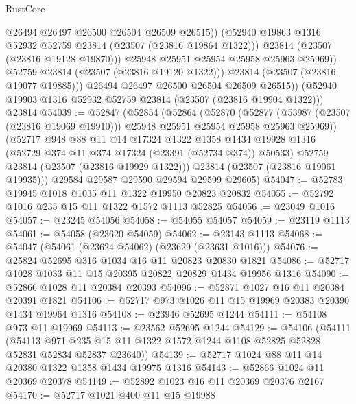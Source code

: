 \begin{lexlean}{RustCore}
\begin{coremodule}
                      @26494
                      @26497
                      @26500
                      @26504
                      @26509
                      @26515))
                  (@52940 @19863 @1316 @52932 @52759 @23814 (@23507 (@23816 @19864 @1322)))
                  @23814
                  (@23507 (@23816 @19128 @19870)))
                @25948
                @25951
                @25954
                @25958
                @25963
                @25969))
            @52759
            @23814
            (@23507 (@23816 @19120 @1322)))
          @23814
          (@23507 (@23816 @19077 @19885)))
        @26494
        @26497
        @26500
        @26504
        @26509
        @26515))
    (@52940 @19903 @1316 @52932 @52759 @23814 (@23507 (@23816 @19904 @1322)))
    @23814
@54039 := @52847
    (@52854
      (@52864
        (@52870
          (@52877
            (@53987 (@23507 (@23816 @19069 @19910)))
            @25948
            @25951
            @25954
            @25958
            @25963
            @25969))
        (@52717
          @948
          @88
          @11
          @14
          @17324
          @1322
          @1358
          @1434
          @19928
          @1316
          (@52729 @374 @11 @374 @17324 (@23391 (@52734 @374)) @50533)
          @52759
          @23814
          (@23507 (@23816 @19929 @1322)))
        @23814
        (@23507 (@23816 @19061 @19935)))
      @29584
      @29587
      @29590
      @29594
      @29599
      @29605)
@54047 := @52783 @19945 @1018 @1035 @11 @1322 @19950 @20823 @20832
@54055 := @52792 @1016 @235 @15 @11 @1322 @1572 @1113 @52825
@54056 := @23049 @1016
@54057 := @23245 @54056
@54058 := @54055 @54057
@54059 := @23119 @1113
@54061 := @54058 (@23620 @54059)
@54062 := @23143 @1113
@54068 := @54047 (@54061 (@23624 @54062) (@23629 (@23631 @1016)))
@54076 := @25824 @52695 @316 @1034 @16 @11 @20823 @20830 @1821
@54086 := @52717 @1028 @1033 @11 @15 @20395 @20822 @20829 @1434 @19956 @1316
@54090 := @52866 @1028 @11 @20384 @20393
@54096 := @52871 @1027 @16 @11 @20384 @20391 @1821
@54106 := @52717 @973 @1026 @11 @15 @19969 @20383 @20390 @1434 @19964 @1316
@54108 := @23946 @52695 @1244
@54111 := @54108 @973 @11 @19969
@54113 := @23562 @52695 @1244
@54129 := @54106
    (@54111
      (@54113 @971 @235 @15 @11 @1322 @1572 @1244 @1108 @52825 @52828 @52831 @52834 @52837 @23640))
@54139 := @52717 @1024 @88 @11 @14 @20380 @1322 @1358 @1434 @19975 @1316
@54143 := @52866 @1024 @11 @20369 @20378
@54149 := @52892 @1023 @16 @11 @20369 @20376 @2167
@54170 := @52717
    @1021
    @400
    @11
    @15
    @19988

\end{coremodule}
\end{lexlean}
